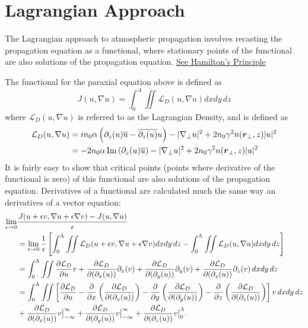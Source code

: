 \section{Lagrangian Approach}
The Lagrangian approach to atmospheric propagation involves recasting the propagation equation as a functional, where stationary points of the functional are also solutions of the propagation equation.  \href{https://en.wikipedia.org/wiki/Hamilton%27s_principle}{See Hamilton's Principle}

The functional for the paraxial equation above is defined as 
\begin{equation}
    J(u,\nabla u) = \int_{0}^{\Lambda} \iint \mathcal{L}_{D}(u,\nabla u) dx dy \, dz
\end{equation}
where $\mathcal{L}_{D}(u,\nabla u)$ is referred to as the Lagrangian Density, and is defined as 
\begin{equation}
\begin{split}
    \mathcal{L}_{D}(u,\nabla u) &= i n_0 \alpha  \left(\partial_{z}(u) \overline{u} - \overline{\partial_{z}(u)}u\right) - |\nabla_{\perp} u|^2 + 2n_0 \gamma^2 n(\mbox{\boldmath{$r$}}_{\perp},z) |u|^2 \\
    &= -2 n_0 \alpha\, \mathrm{Im}\left(\partial_{z}(u) \overline{u}\right) - |\nabla_{\perp} u|^2 + 2n_0 \gamma^2 n(\mbox{\boldmath{$r$}}_{\perp},z) |u|^2 
\end{split}
\end{equation}
It is fairly easy to show that critical points (points where derivative of the functional is zero) of this functional are also solutions of the propagation equation.  Derivatives of a functional are calculated much the same way an derivatives of a vector equation:
\begin{equation}
\begin{split}
    \lim_{\epsilon \to 0} &\frac{J(u+\epsilon v, \nabla u + \epsilon \nabla v)-J(u,\nabla u)}{\epsilon} \\
    &= \lim_{\epsilon \to 0} \frac{1}{\epsilon} \left[\int_{0}^{\Lambda} \iint \mathcal{L}_{D}(u+\epsilon v,\nabla u + \epsilon \nabla v) dx dy \, dz - \int_{0}^{\Lambda} \iint \mathcal{L}_{D}(u,\nabla u) dx dy \, dz\right] \\
    &= \int_{0}^{\Lambda} \iint \frac{\partial \mathcal{L}_{D}}{\partial u} v+ \frac{\partial \mathcal{L}_{D}}{\partial (\partial_{x}(u))} \partial_{x}(v) + \frac{\partial \mathcal{L}_{D}}{\partial (\partial_{y}(u))} \partial_{y}(v)   + \frac{\partial \mathcal{L}_{D}}{\partial (\partial_{z}(u))} \partial_{z}(v) \,dx dy \, dz\\
    &= \int_{0}^{\Lambda} \iint \left[\frac{\partial \mathcal{L}_{D}}{\partial u}  - \frac{\partial }{\partial x}\left(\frac{\partial \mathcal{L}_{D}}{\partial (\partial_{x}(u))}\right)
    -\frac{\partial }{\partial y}\left(\frac{\partial \mathcal{L}_{D}}{\partial (\partial_{y}(u))}\right)
    -\frac{\partial }{\partial z}\left(\frac{\partial \mathcal{L}_{D}}{\partial (\partial_{z}(u))}\right)\right] v \,dx dy \, dz \\
    &+ \frac{\partial \mathcal{L}_{D}}{\partial (\partial_{x}(u))}v \big|_{-\infty}^{\infty} + \frac{\partial \mathcal{L}_{D}}{\partial (\partial_{y}(u))} v \big|_{-\infty}^{\infty} + \frac{\partial \mathcal{L}_{D}}{\partial (\partial_{z}(u))} v \big|_{0}^{\Lambda}.
\end{split}
\end{equation}
